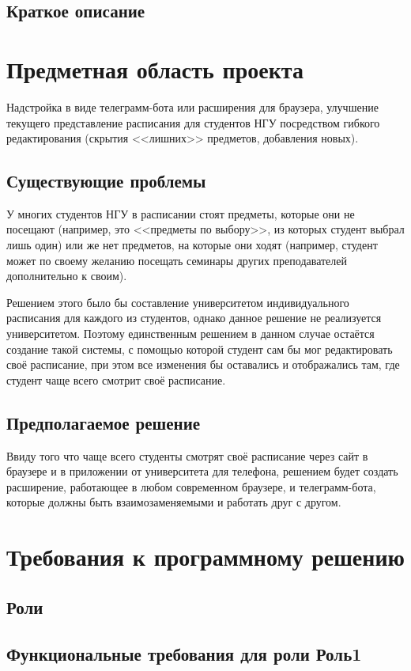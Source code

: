 \documentclass[a4paper]{report}
\begin{document}
		\section{Краткое описание}	
	\chapter{Предметная область проекта}
		Надстройка в виде телеграмм-бота или расширения для браузера, улучшение текущего представление расписания для студентов НГУ посредством гибкого редактирования (скрытия <<лишних>> предметов, добавления новых).
	
		\section{Существующие проблемы}
			У многих студентов НГУ в расписании стоят предметы, которые они не посещают (например, это <<предметы по выбору>>, из которых студент выбрал лишь один) или же нет предметов, на которые они ходят (например, студент может по своему желанию посещать семинары других преподавателей дополнительно к своим).
			
			Решением этого было бы составление университетом индивидуального расписания для каждого из студентов, однако данное решение не реализуется университетом. Поэтому единственным решением в данном случае остаётся создание такой системы, с помощью которой студент сам бы мог редактировать своё расписание, при этом все изменения бы оставались и отображались там, где студент чаще всего смотрит своё расписание. 
		\section{Предполагаемое решение}
			Ввиду того что чаще всего студенты смотрят своё расписание через сайт в браузере и в приложении от университета для телефона, решением будет создать расширение, работающее в любом современном браузере, и телеграмм-бота, которые должны быть взаимозаменяемыми и работать друг с другом.
	\chapter{Требования к программному решению}
		\section{Роли}
		
		\section{Функциональные требования для роли Роль1}
\end{document}
